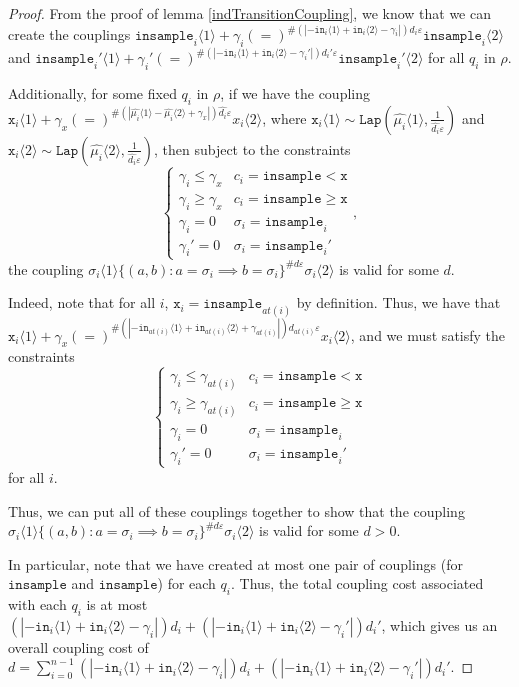 \documentclass[12pt]{article}
\newcommand{\gguard}[1][x]{\texttt{insample}\geq #1}
\newcommand{\lguard}[1][x]{\texttt{insample} < #1}
\newcommand{\brangle}[1]{\langle #1 \rangle}
\newcommand{\Lap}{\texttt{Lap}}
\theoremstyle{definition}
\begin{document}
\begin{proof}
    From the proof of lemma \ref{indTransitionCoupling}, we know that we can create the couplings $\texttt{insample}_i\brangle{1} +\gamma_i{(=)}^{\#(|-\texttt{in}_i\brangle{1}+\texttt{in}_i\brangle{2}-\gamma_i|)d_i\varepsilon}\texttt{insample}_i\brangle{2}$ and $\texttt{insample}_i'\brangle{1} +\gamma_i'{(=)}^{\#(|-\texttt{in}_i\brangle{1}+\texttt{in}_i\brangle{2}-\gamma_i'|)d_i'\varepsilon}\texttt{insample}_i'\brangle{2}$ for all $q_i$ in $\rho$. 

    Additionally, for some fixed $q_i$ in $\rho$, if we have the coupling $\texttt{x}_i\brangle{1}+\gamma_x (=)^{\#(|\hat{\mu_i}\brangle{1}-\hat{\mu_i}\brangle{2}+\gamma_x|)\hat{d_i}\varepsilon}x_i\brangle{2}$, where $\texttt{x}_i\brangle{1}\sim \Lap(\hat{\mu_i}\brangle{1}, \frac{1}{\hat{d_i}\varepsilon})$ and $\texttt{x}_i\brangle{2}\sim \Lap(\hat{\mu_i}\brangle{2}, \frac{1}{\hat{d_i}\varepsilon})$, then subject to the constraints \[
        \begin{cases}
          \gamma_i\leq\gamma_x & c_i = \lguard[\texttt{x}]\\
          \gamma_i\geq\gamma_x & c_i = \gguard[\texttt{x}]\\
          \gamma_i=0 & \sigma_i = \texttt{insample}_i\\
          \gamma_i'=0 & \sigma_i = \texttt{insample}_i'
        \end{cases},
      \]
    the coupling $\sigma_i\brangle{1}\{(a, b): a=\sigma_i\implies b=\sigma_i\}^{\#d\varepsilon}\sigma_i\brangle{2}$ is valid for some $d$. 

    Indeed, note that for all $i$, $\texttt{x}_i = \texttt{insample}_{at(i)}$ by definition. Thus, we have that $\texttt{x}_i\brangle{1}+\gamma_x (=)^{\#(|-\texttt{in}_{at(i)}\brangle{1}+\texttt{in}_{at(i)}\brangle{2}+\gamma_{at(i)}|)d_{at(i)}\varepsilon}x_i\brangle{2}$, and we must satisfy the constraints \[
        \begin{cases}
          \gamma_i\leq\gamma_{at(i)} & c_i = \lguard[\texttt{x}]\\
          \gamma_i\geq\gamma_{at(i)} & c_i = \gguard[\texttt{x}]\\
          \gamma_i=0 & \sigma_i = \texttt{insample}_i\\
          \gamma_i'=0 & \sigma_i = \texttt{insample}_i'
        \end{cases}
      \]
      for all $i$.

    Thus, we can put all of these couplings together to show that the coupling $\sigma_i\brangle{1}\{(a, b): a=\sigma_i\implies b=\sigma_i\}^{\#d\varepsilon}\sigma_i\brangle{2}$ is valid for some $d>0$.

    In particular, note that we have created at most one pair of couplings (for $\texttt{insample}$ and $\texttt{insample}$) for each $q_i$. Thus, the total coupling cost associated with each $q_i$ is at most $(|-\texttt{in}_i\brangle{1}+\texttt{in}_i\brangle{2}-\gamma_i|)d_i+(|-\texttt{in}_i\brangle{1}+\texttt{in}_i\brangle{2}-\gamma_i'|)d_i'$, 
    which gives us an overall coupling cost of $d = \sum_{i=0}^{n-1}(|-\texttt{in}_i\brangle{1}+\texttt{in}_i\brangle{2}-\gamma_i|)d_i+(|-\texttt{in}_i\brangle{1}+\texttt{in}_i\brangle{2}-\gamma_i'|)d_i'$.
\end{proof}
\end{document}
